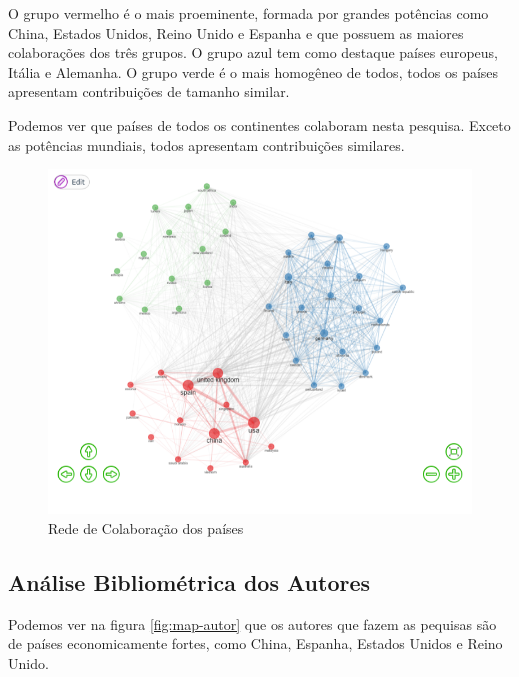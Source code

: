 O grupo vermelho é o mais proeminente, formada por grandes potências como China, Estados Unidos, Reino Unido e Espanha e que possuem as maiores colaborações dos três grupos. O grupo azul tem como destaque países europeus, Itália e Alemanha. O grupo verde é o mais homogêneo de todos, todos os países apresentam contribuições de tamanho similar.

Podemos ver que países de todos os continentes colaboram nesta pesquisa. Exceto as potências mundiais, todos apresentam contribuições similares.

\begin{figure}[ht]
    \centering
    \includegraphics[width=12cm]{experiments/Tong00020/PesquisaBibliometrica/Social Structure/MASSA@Tong00020-Collaboration Network.png}
    \caption{Rede de Colaboração dos países}
    \label{fig:rede-tres}
\end{figure}

\subsection{Análise Bibliométrica dos Autores}

Podemos ver na  figura \ref{fig:map-autor} que os autores que fazem as pequisas são de países economicamente fortes, como China, Espanha, Estados Unidos e Reino Unido.

